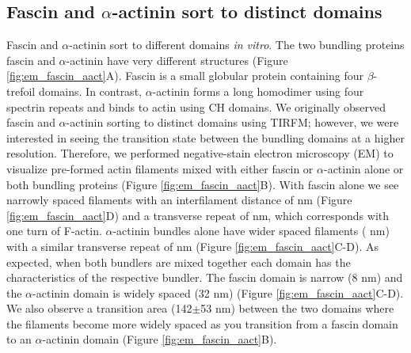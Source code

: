 \subsection{Fascin and \texorpdfstring{$\alpha$}{alpha}-actinin sort to distinct domains}
Fascin and $\alpha$-actinin sort to different domains \textit{in vitro}. The two bundling proteins fascin and $\alpha$-actinin have very different structures (Figure \ref{fig:em_fascin_aact}A). Fascin is a small globular protein containing  four $\beta$-trefoil domains. In contrast, $\alpha$-actinin forms a long homodimer using four spectrin repeats and binds to actin using CH domains. We originally observed fascin and $\alpha$-actinin sorting to distinct domains using TIRFM; however, we were interested in seeing the transition state between the bundling domains at a higher resolution. Therefore, we performed negative-stain electron microscopy (EM) to visualize pre-formed actin filaments mixed with either fascin or $\alpha$-actinin alone or both bundling proteins (Figure \ref{fig:em_fascin_aact}B). With fascin alone we see narrowly spaced filaments with an interfilament distance of  nm (Figure \ref{fig:em_fascin_aact}D) and a transverse repeat of  nm, which corresponds with one turn of F-actin. $\alpha$-actinin bundles alone have wider spaced filaments ( nm) with a similar transverse repeat of  nm (Figure \ref{fig:em_fascin_aact}C-D). As expected, when both bundlers are mixed together each domain has the characteristics of the respective bundler. The fascin domain is narrow (8 nm) and the $\alpha$-actinin domain is widely spaced (32 nm) (Figure \ref{fig:em_fascin_aact}C-D). We also observe a transition area (142$\pm$53 nm) between the two domains where the filaments become more widely spaced as you transition from a fascin domain to an $\alpha$-actinin domain (Figure \ref{fig:em_fascin_aact}B). 

